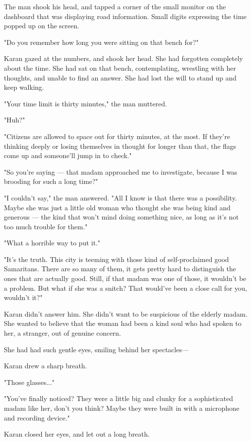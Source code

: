 The man shook his head, and tapped a corner of the small monitor on the
dashboard that was displaying road information. Small digits expressing
the time popped up on the screen.

"Do you remember how long you were sitting on that bench for?"

Karan gazed at the numbers, and shook her head. She had forgotten
completely about the time. She had sat on that bench, contemplating,
wrestling with her thoughts, and unable to find an answer. She had lost
the will to stand up and keep walking.

"Your time limit is thirty minutes," the man muttered.

"Huh?"

"Citizens are allowed to space out for thirty minutes, at the most. If
they're thinking deeply or losing themselves in thought for longer than
that, the flags come up and someone'll jump in to check."

"So you're saying --- that madam approached me to investigate, because I
was brooding for such a long time?"

"I couldn't say," the man answered. "All I know is that there was a
possibility. Maybe she was just a little old woman who thought she was
being kind and generous --- the kind that won't mind doing something nice,
as long as it's not too much trouble for them."

"What a horrible way to put it."

"It's the truth. This city is teeming with those kind of self-proclaimed
good Samaritans. There are so many of them, it gets pretty hard to
distinguish the ones that are actually good. Still, if that madam was
one of those, it wouldn't be a problem. But what if she was a snitch?
That would've been a close call for you, wouldn't it?"

Karan didn't answer him. She didn't want to be suspicious of the elderly
madam. She wanted to believe that the woman had been a kind soul who had
spoken to her, a stranger, out of genuine concern.

She had had such gentle eyes, smiling behind her spectacles---

Karan drew a sharp breath.

"Those glasses..."

"You've finally noticed? They were a little big and clunky for a
sophisticated madam like her, don't you think? Maybe they were built in
with a microphone and recording device."

Karan closed her eyes, and let out a long breath.

